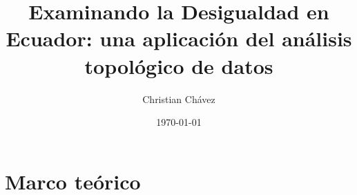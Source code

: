 \documentclass[a4paper,11pt]{article}
\title{
    Examinando la Desigualdad en Ecuador: una aplicación del análisis topológico de datos
}
\author{Christian Chávez}
\date{\today}
\newcommand{\red}[1]{\textcolor{red}{#1}}
\begin{document}
\maketitle

\begin{abstract}
    
\end{abstract}









\section{Marco teórico}
\end{document}
